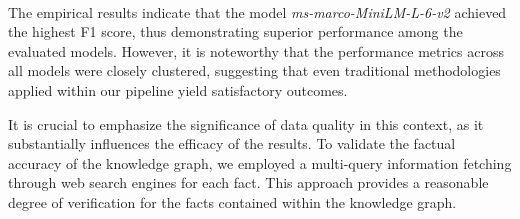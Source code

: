 \begin{table}[h!]
    \centering
    \noindent
    \caption{Performance evaluation of various document retrieval methods on the FactBench dataset, using the Gemma2 model.}
    {\scriptsize {}}\\
    \label{tab:evaluation_results}
\end{table}

The empirical results indicate that the model \textit{ms-marco-MiniLM-L-6-v2} achieved the highest F1 score, thus demonstrating superior performance among the evaluated models.
However, it is noteworthy that the performance metrics across all models were closely clustered, suggesting that even traditional methodologies applied within our pipeline yield satisfactory outcomes.

It is crucial to emphasize the significance of data quality in this context, as it substantially influences the efficacy of the results.
To validate the factual accuracy of the knowledge graph, we employed a multi-query information fetching through web search engines for each fact.
This approach provides a reasonable degree of verification for the facts contained within the knowledge graph.

